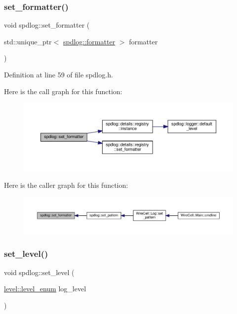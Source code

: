 \subsubsection{\texorpdfstring{set\+\_\+formatter()}{set\_formatter()}}
{\footnotesize\ttfamily void spdlog\+::set\+\_\+formatter (\begin{DoxyParamCaption}\item[{std\+::unique\+\_\+ptr$<$ \hyperlink{classspdlog_1_1formatter}{spdlog\+::formatter} $>$}]{formatter }\end{DoxyParamCaption})\hspace{0.3cm}{\ttfamily [inline]}}



Definition at line 59 of file spdlog.\+h.

Here is the call graph for this function\+:
\nopagebreak
\begin{figure}[H]
\begin{center}
\leavevmode
\includegraphics[width=350pt]{namespacespdlog_a83007016a4f374c8efcc738eee5b7290_cgraph}
\end{center}
\end{figure}
Here is the caller graph for this function\+:
\nopagebreak
\begin{figure}[H]
\begin{center}
\leavevmode
\includegraphics[width=350pt]{namespacespdlog_a83007016a4f374c8efcc738eee5b7290_icgraph}
\end{center}
\end{figure}
\mbox{\label{namespacespdlog_a9f952c6a1e1114b474aff89965261a1b}} 
\subsubsection{\texorpdfstring{set\+\_\+level()}{set\_level()}}
{\footnotesize\ttfamily void spdlog\+::set\+\_\+level (\begin{DoxyParamCaption}\item[{\hyperlink{namespacespdlog_1_1level_a35f5227e5daf228d28a207b7b2aefc8b}{level\+::level\+\_\+enum}}]{log\+\_\+level }\end{DoxyParamCaption})\hspace{0.3cm}{\ttfamily [inline]}}



